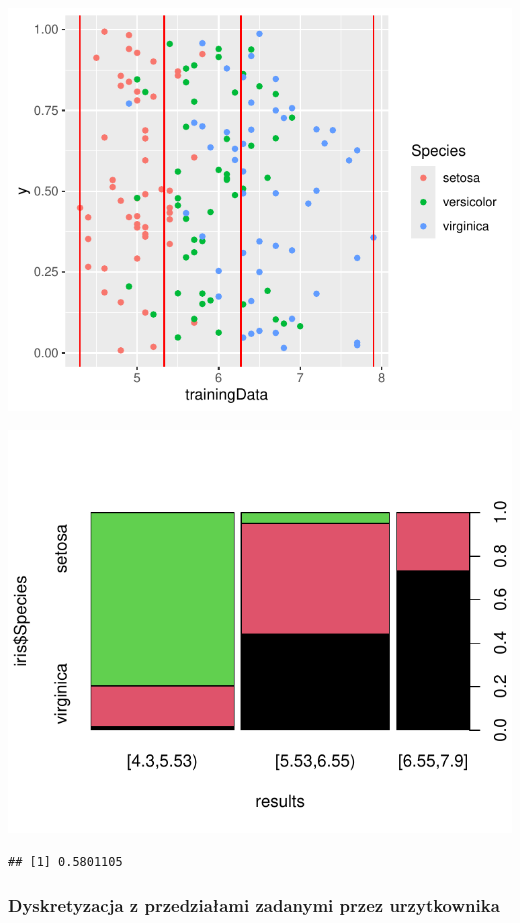 \documentclass[
  12pt,
]{article}
\begin{document}
\begin{center}\includegraphics{Sprawozdanie2_files/figure-latex/kMeans_najg-2} \end{center}

\begin{center}\includegraphics{Sprawozdanie2_files/figure-latex/tabela_kondygnacji_3_najg-1} \end{center}

\begin{verbatim}
## [1] 0.5801105
\end{verbatim}

\subsubsection{Dyskretyzacja z przedziałami zadanymi przez
urzytkownika}\label{dyskretyzacja-z-przedziaux142ami-zadanymi-przez-urzytkownika}
\end{document}
